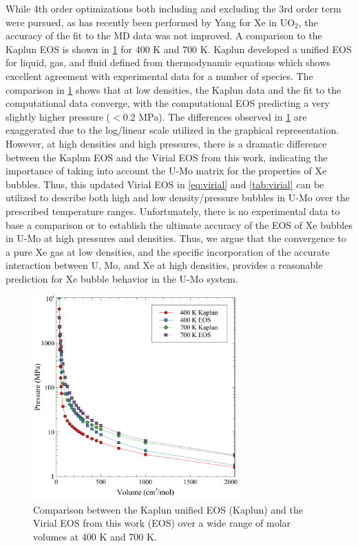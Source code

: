 \documentclass[review]{elsarticle}
\begin{document}
While 4th order optimizations both including and excluding the 3rd order term were pursued, as has recently been performed by Yang \cite{yang2022} for Xe in UO$_2$, the accuracy of the fit to the MD data was not improved. A comparison to the Kaplun EOS \cite{Kaplun2003} is shown in \cref{fig:kap_comp} for 400 K and 700 K. Kaplun developed a unified EOS for liquid, gas, and fluid defined from thermodynamic equations which shows excellent agreement with experimental data for a number of species. The comparison in \cref{fig:kap_comp} shows that at low densities, the Kaplun data and the fit to the computational data converge, with the computational EOS predicting a very slightly higher pressure ($<$0.2 MPa). The differences observed in \cref{fig:kap_comp} are exaggerated due to the log/linear scale utilized in the graphical representation. However, at high densities and high pressures, there is a dramatic difference between the Kaplun EOS and the Virial EOS from this work, indicating the importance of taking into account the U-Mo matrix for the properties of Xe bubbles. Thus, this updated Virial EOS in \cref{eq:virial} and \cref{tab:virial} can be utilized to describe both high and low density/pressure bubbles in U-Mo over the prescribed temperature ranges. Unfortunately, there is no experimental data to base a comparison or to establish the ultimate accuracy of the EOS of Xe bubbles in U-Mo at high pressures and densities. Thus, we argue that the convergence to a pure Xe gas at low densities, and the specific incorporation of the accurate interaction between U, Mo, and Xe at high densities, provides a reasonable prediction for Xe bubble behavior in the U-Mo system. 

\begin{figure}[h!]
 \centering
 \includegraphics[width=0.7\textwidth]{kaplun_comp} 
 \caption{Comparison between the Kaplun unified EOS (Kaplun) and the Virial EOS from this work (EOS) over a wide range of molar volumes at 400 K and 700 K.}
 \label{fig:kap_comp}
\end{figure}
\end{document}
